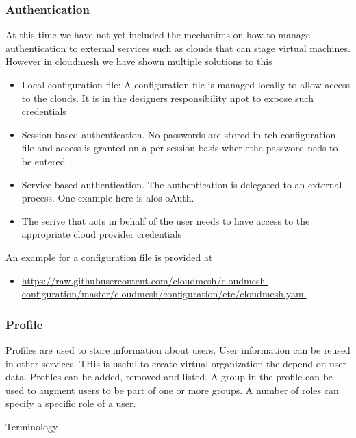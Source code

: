 \documentclass[9pt,]{article}
\providecommand{\tightlist}{%
  \setlength{\itemsep}{0pt}\setlength{\parskip}{0pt}}
\begin{document}
\hypertarget{authentication}{%
\subsubsection{Authentication}\label{authentication}}

At this time we have not yet included the mechanims on how to manage
authentication to external services such as clouds that can stage
virtual machines. However in cloudmesh we have shown multiple solutions
to this

\begin{itemize}
\tightlist
\item
  Local configuration file: A configuration file is managed locally to
  allow access to the clouds. It is in the designers responsibility npot
  to expose such credentials
\item
  Session based authentication. No passwords are stored in teh
  configuration file and access is granted on a per session basis wher
  ethe password neds to be entered
\item
  Service based authentication. The authentication is delegated to an
  external process. One example here is alos oAuth.
\item
  The serive that acts in behalf of the user needs to have access to the
  appropriate cloud provider credentials
\end{itemize}

An example for a configuration file is provided at

\begin{itemize}
\tightlist
\item
  \url{https://raw.githubusercontent.com/cloudmesh/cloudmesh-configuration/master/cloudmesh/configuration/etc/cloudmesh.yaml}
\end{itemize}

\hypertarget{profile}{%
\subsubsection{Profile}\label{profile}}

Profiles are used to store information about users. User information can
be reused in other services. THis is useful to create virtual
organization the depend on user data. Profiles can be added, removed and
listed. A group in the profile can be used to augment users to be part
of one or more groups. A number of roles can specify a specific role of
a user.

Terminology
\end{document}
